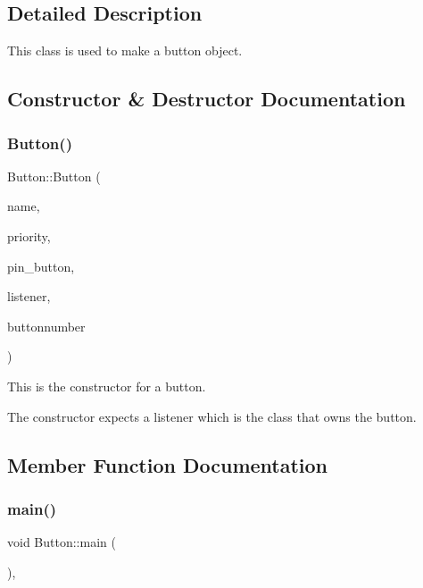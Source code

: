 \subsection{Detailed Description}
This class is used to make a button object. 

\subsection{Constructor \& Destructor Documentation}
\mbox{\label{class_button_a7771486e8e6649ee30c85ab5580796da}} 
\subsubsection{\texorpdfstring{Button()}{Button()}}
{\footnotesize\ttfamily Button\+::\+Button (\begin{DoxyParamCaption}\item[{const char $\ast$}]{name,  }\item[{int}]{priority,  }\item[{hwlib\+::pin\+\_\+in \&}]{pin\+\_\+button,  }\item[{\mbox{\hyperlink{class_button_listener}{Button\+Listener}} \&}]{listener,  }\item[{unsigned int}]{buttonnumber }\end{DoxyParamCaption})\hspace{0.3cm}{\ttfamily [inline]}}



This is the constructor for a button. 

The constructor expects a listener which is the class that owns the button. 

\subsection{Member Function Documentation}
\mbox{\label{class_button_a4cc671cc425acd0ee1b8f2f437cf40db}} 
\subsubsection{\texorpdfstring{main()}{main()}}
{\footnotesize\ttfamily void Button\+::main (\begin{DoxyParamCaption}{ }\end{DoxyParamCaption})\hspace{0.3cm}{\ttfamily [inline]}, {\ttfamily [override]}}



